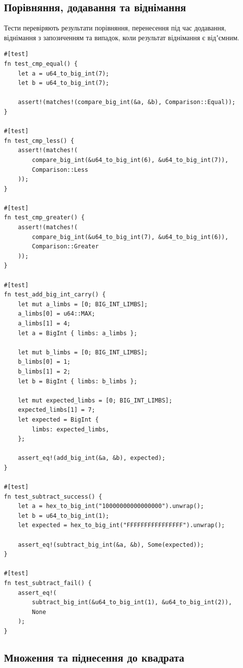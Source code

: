 \documentclass[11pt]{article}
\begin{document}
\subsection{Порівняння, додавання та віднімання}

Тести перевіряють результати порівняння, перенесення під час додавання, віднімання з запозиченням та випадок, коли результат віднімання є відʼємним.

\begin{lstlisting}[style=ruststyle]
#[test]
fn test_cmp_equal() {
    let a = u64_to_big_int(7);
    let b = u64_to_big_int(7);

    assert!(matches!(compare_big_int(&a, &b), Comparison::Equal));
}

#[test]
fn test_cmp_less() {
    assert!(matches!(
        compare_big_int(&u64_to_big_int(6), &u64_to_big_int(7)),
        Comparison::Less
    ));
}

#[test]
fn test_cmp_greater() {
    assert!(matches!(
        compare_big_int(&u64_to_big_int(7), &u64_to_big_int(6)),
        Comparison::Greater
    ));
}

#[test]
fn test_add_big_int_carry() {
    let mut a_limbs = [0; BIG_INT_LIMBS];
    a_limbs[0] = u64::MAX;
    a_limbs[1] = 4;
    let a = BigInt { limbs: a_limbs };

    let mut b_limbs = [0; BIG_INT_LIMBS];
    b_limbs[0] = 1;
    b_limbs[1] = 2;
    let b = BigInt { limbs: b_limbs };

    let mut expected_limbs = [0; BIG_INT_LIMBS];
    expected_limbs[1] = 7;
    let expected = BigInt {
        limbs: expected_limbs,
    };

    assert_eq!(add_big_int(&a, &b), expected);
}

#[test]
fn test_subtract_success() {
    let a = hex_to_big_int("10000000000000000").unwrap();
    let b = u64_to_big_int(1);
    let expected = hex_to_big_int("FFFFFFFFFFFFFFFF").unwrap();

    assert_eq!(subtract_big_int(&a, &b), Some(expected));
}

#[test]
fn test_subtract_fail() {
    assert_eq!(
        subtract_big_int(&u64_to_big_int(1), &u64_to_big_int(2)),
        None
    );
}
\end{lstlisting}

\subsection{Множення та піднесення до квадрата}
\end{document}
